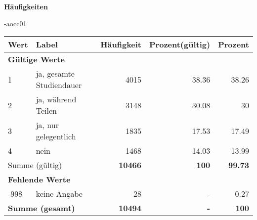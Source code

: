         		\vspace*{0.5cm}
                \noindent\textbf{Häufigkeiten}

                \vspace*{-\baselineskip}
					\begin{filecontents}{\jobname-aocc01}
					\begin{longtable}{lXrrr}
					\toprule
					\textbf{Wert} & \textbf{Label} & \textbf{Häufigkeit} & \textbf{Prozent(gültig)} & \textbf{Prozent} \\
					\endhead
					\midrule
					\multicolumn{5}{l}{\textbf{Gültige Werte}}\\

					1 &
					\multicolumn{1}{X}{ ja, gesamte Studiendauer   } &


					  \num{4015} &
					  \num[round-mode=places,round-precision=2]{38.36} &
					    \num[round-mode=places,round-precision=2]{38.26} \\

					2 &
					\multicolumn{1}{X}{ ja, während Teilen   } &


					  \num{3148} &
					  \num[round-mode=places,round-precision=2]{30.08} &
					    \num[round-mode=places,round-precision=2]{30} \\

					3 &
					\multicolumn{1}{X}{ ja, nur gelegentlich   } &


					  \num{1835} &
					  \num[round-mode=places,round-precision=2]{17.53} &
					    \num[round-mode=places,round-precision=2]{17.49} \\

					4 &
					\multicolumn{1}{X}{ nein   } &


					  \num{1468} &
					  \num[round-mode=places,round-precision=2]{14.03} &
					    \num[round-mode=places,round-precision=2]{13.99} \\
					\midrule
					\multicolumn{2}{l}{Summe (gültig)} &
					  \textbf{\num{10466}} &
					\textbf{\num{100}} &
					  \textbf{\num[round-mode=places,round-precision=2]{99.73}} \\
					\multicolumn{5}{l}{\textbf{Fehlende Werte}}\\
							-998 &
							keine Angabe &
							  \num{28} &
							 - &
							  \num[round-mode=places,round-precision=2]{0.27} \\
					\midrule
					\multicolumn{2}{l}{\textbf{Summe (gesamt)}} &
				      \textbf{\num{10494}} &
				    \textbf{-} &
				    \textbf{\num{100}} \\
					\bottomrule
					\end{longtable}
					\end{filecontents}
